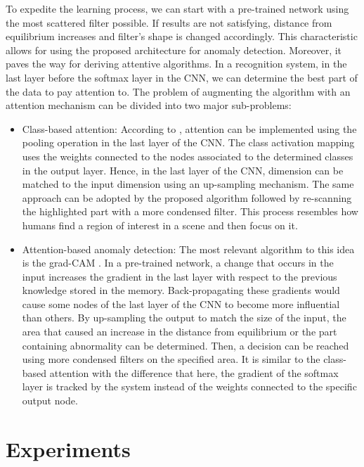 \documentclass[journal]{IEEEtran}
\begin{document}
To expedite the learning process, we can start with a pre-trained network using the most scattered filter possible. If results are not satisfying, distance from equilibrium increases and filter's shape is changed accordingly. This characteristic allows for using the proposed architecture for anomaly detection. Moreover, it paves the way for deriving attentive algorithms. In a recognition system, in the last layer before the softmax layer in the CNN, we can determine the best part of the data to pay attention to. The problem of augmenting the algorithm with an attention mechanism can be divided into two major sub-problems:
\begin{itemize}
\item Class-based attention: According to \cite{zhou2016learning}, attention can be implemented using the pooling operation in the last layer of the CNN. The class activation mapping uses the weights connected to the nodes associated to the determined classes in the output layer. Hence, in the last layer of the CNN, dimension can be matched to the input dimension using an up-sampling mechanism. The same approach can be adopted by the proposed algorithm followed by re-scanning the highlighted part with a more condensed filter. This process resembles how humans find a region of interest in a scene and then focus on it.
\item Attention-based anomaly detection: The most relevant algorithm to this idea is the grad-CAM \cite{selvaraju2017grad}. In a pre-trained network, a change that occurs in the input increases the gradient in the last layer with respect to the previous knowledge stored in the memory. Back-propagating these gradients would cause some nodes of the last layer of the CNN to become more influential than others. By up-sampling the output to match the size of the input, the area that caused an increase in the distance from equilibrium or the part containing abnormality can be determined. Then, a decision can be reached using more condensed filters on the specified area. It is similar to the class-based attention with the difference that here, the gradient of the softmax layer is tracked by the system instead of the weights connected to the specific output node.
\end{itemize}


\section{Experiments}
\end{document}
